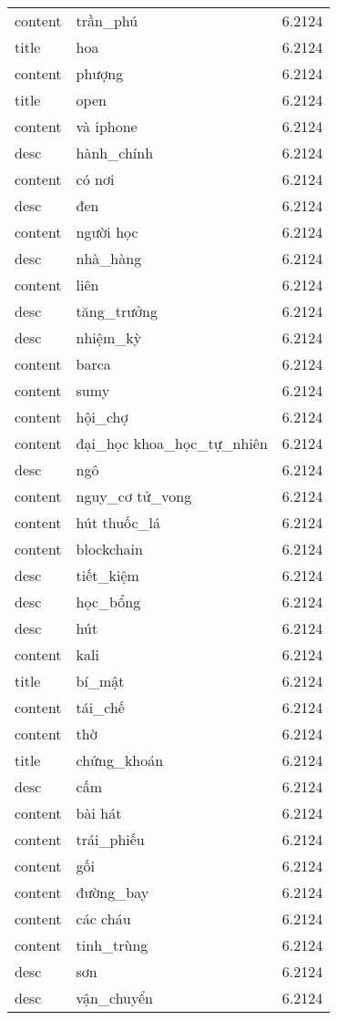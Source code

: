 \documentclass{article}
\begin{document}
\begin{tabular}{lll}
content & trần\_phú & 6.2124\\
title & hoa & 6.2124\\
content & phượng & 6.2124\\
title & open & 6.2124\\
content & và iphone & 6.2124\\
desc & hành\_chính & 6.2124\\
content & có nơi & 6.2124\\
desc & đen & 6.2124\\
content & người học & 6.2124\\
desc & nhà\_hàng & 6.2124\\
content & liên & 6.2124\\
desc & tăng\_trưởng & 6.2124\\
desc & nhiệm\_kỳ & 6.2124\\
content & barca & 6.2124\\
content & sumy & 6.2124\\
content & hội\_chợ & 6.2124\\
content & đại\_học khoa\_học\_tự\_nhiên & 6.2124\\
desc & ngô & 6.2124\\
content & nguy\_cơ tử\_vong & 6.2124\\
content & hút thuốc\_lá & 6.2124\\
content & blockchain & 6.2124\\
desc & tiết\_kiệm & 6.2124\\
desc & học\_bổng & 6.2124\\
desc & hút & 6.2124\\
content & kali & 6.2124\\
title & bí\_mật & 6.2124\\
content & tái\_chế & 6.2124\\
content & thờ & 6.2124\\
title & chứng\_khoán & 6.2124\\
desc & cấm & 6.2124\\
content & bài hát & 6.2124\\
content & trái\_phiếu & 6.2124\\
content & gối & 6.2124\\
content & đường\_bay & 6.2124\\
content & các cháu & 6.2124\\
content & tinh\_trùng & 6.2124\\
desc & sơn & 6.2124\\
desc & vận\_chuyển & 6.2124\\

\end{tabular}
\end{document}

